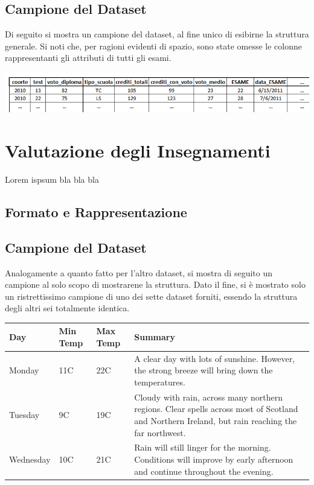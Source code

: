 \subsection{Campione del Dataset}

Di seguito si mostra un campione del dataset, al fine unico di esibirne la struttura generale. Si noti che, per ragioni evidenti di spazio, sono state omesse le colonne rappresentanti gli attributi di tutti gli esami.

\begin{center}
	\includegraphics[scale=0.5]{../raw/stud_sample.png}
\end{center}

\section{Valutazione degli Insegnamenti}
	Lorem ispsum bla bla bla

\subsection{Formato e Rappresentazione}

\subsection{Campione del Dataset}

Analogamente a quanto fatto per l'altro dataset, si mostra di seguito un campione al solo scopo di mostrarene la struttura. Dato il fine, si è mostrato solo un ristrettissimo campione di uno dei sette dataset forniti, essendo la struttura degli altri sei totalmente identica.

\begin{center}
    \begin{tabular}{| l | l | l | l |}
    \hline
    Day & Min Temp & Max Temp & Summary \\ \hline
    Monday & 11C & 22C & A clear day with lots of sunshine.
    However, the strong breeze will bring down the temperatures. \\ \hline
    Tuesday & 9C & 19C & Cloudy with rain, across many northern regions. Clear spells 
    across most of Scotland and Northern Ireland, 
    but rain reaching the far northwest. \\ \hline
    Wednesday & 10C & 21C & Rain will still linger for the morning. 
    Conditions will improve by early afternoon and continue 
    throughout the evening. \\
    \hline
    \end{tabular}
\end{center}
